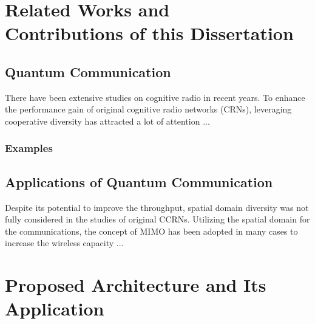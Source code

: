 \documentclass[master,english,final]{kaist-ucs}
\begin{document}
\tableofcontents

\listoftables

\listoffigures





\chapter[Related Works and Contributions of this Dissertation]{Related Works and \\ Contributions of this Dissertation}

\section{Quantum Communication}

There have been extensive studies on cognitive radio in recent years. To enhance the performance gain of original cognitive radio networks (CRNs), leveraging cooperative diversity has attracted a lot of attention \cite{SOCA1}...

\subsection{Examples}


\section{Applications of Quantum Communication}

Despite its potential to improve the throughput, spatial domain diversity was not fully considered in the studies of original CCRNs. Utilizing the spatial domain for the communications, the concept of MIMO has been adopted in many cases to increase the wireless capacity \cite{EF1,FD2}...


\chapter{Proposed Architecture and Its Application}
\end{document}
